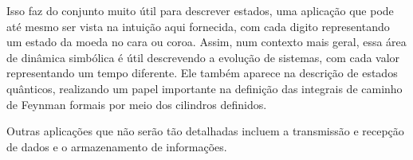 \documentclass{article}
\begin{document}
Isso faz do conjunto muito \'util para descrever estados, uma aplica\c c\~ao que pode at\'e mesmo ser 
vista na intui\c c\~ao aqui fornecida, com cada digito representando um estado da moeda no cara
ou coroa. Assim, num contexto mais geral, essa \'area de din\^amica simb\'olica \'e \'util descrevendo
a evolu\c c\~ao de sistemas, com cada valor representando um tempo diferente. Ele tamb\'em aparece
na descri\c c\~ao de estados qu\^anticos, realizando um papel importante na defini\c c\~ao das
integrais de caminho de Feynman formais por meio dos cilindros definidos.

Outras aplica\c c\~oes que n\~ao ser\~ao t\~ao detalhadas incluem a transmiss\~ao e recep\c c\~ao de 
dados e o armazenamento de informa\c c\~oes.
\end{document}
